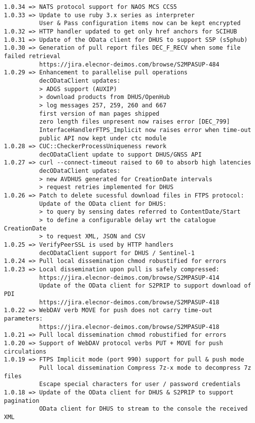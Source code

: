 \documentclass[dec_sum_main.tex]{subfiles}
\begin{document}
\begin{Verbatim}[tabsize=4]
1.0.34 => NATS protocol support for NAOS MCS CCS5
1.0.33 => Update to use ruby 3.x series as interpreter
          User & Pass configuration items now can be kept encrypted
1.0.32 => HTTP handler updated to get only href anchors for SCIHUB
1.0.31 => Update of the OData client for DHUS to support S5P (s5phub)
1.0.30 => Generation of pull report files DEC_F_RECV when some file failed retrieval
          https://jira.elecnor-deimos.com/browse/S2MPASUP-484
1.0.29 => Enhancement to parallelise pull operations
          decODataClient updates:
          > ADGS support (AUXIP)
          > download products from DHUS/OpenHub
          > log messages 257, 259, 260 and 667
          first version of man pages shipped
          zero length files unpresent now raises error [DEC_799]
          InterfaceHandlerFTPS_Implicit now raises error when time-out 
          public API now kept under ctc module
1.0.28 => CUC::CheckerProcessUniqueness rework
          decODataClient update to support DHUS/GNSS API
1.0.27 => curl --connect-timeout raised to 60 to absorb high latencies
          decODataClient updates:
          > new AVDHUS generated for CreationDate intervals
          > request retries implemented for DHUS
1.0.26 => Patch to delete sucessful download files in FTPS protocol:
          Update of the OData client for DHUS:
          > to query by sensing dates referred to ContentDate/Start
          > to define a configurable delay wrt the catalogue CreationDate
          > to request XML, JSON and CSV
1.0.25 => VerifyPeerSSL is used by HTTP handlers
          decODataClient support for DHUS / Sentinel-1
1.0.24 => Pull local dissemination chmod robustified for errors
1.0.23 => Local dissemination upon pull is safely compressed:
          https://jira.elecnor-deimos.com/browse/S2MPASUP-414
          Update of the OData client for S2PRIP to support download of PDI
          https://jira.elecnor-deimos.com/browse/S2MPASUP-418
1.0.22 => WebDAV verb MOVE for push does not carry time-out parameters:
          https://jira.elecnor-deimos.com/browse/S2MPASUP-418
1.0.21 => Pull local dissemination chmod robustified for errors
1.0.20 => Support of WebDAV protocol verbs PUT + MOVE for push circulations
1.0.19 => FTPS Implicit mode (port 990) support for pull & push mode
          Pull local dissemination Compress 7z-x mode to decompress 7z files
          Escape special characters for user / password credentials
1.0.18 => Update of the OData client for DHUS & S2PRIP to support pagination
          OData client for DHUS to stream to the console the received XML

\end{Verbatim}
\end{document}
